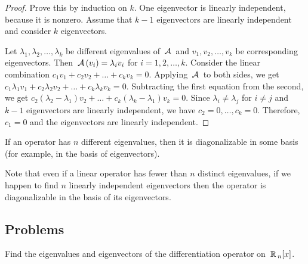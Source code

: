 \begin{proof}
Prove this by induction on $k$. One eigenvector is linearly independent, because it is nonzero. Assume that $k-1$ eigenvectors are linearly independent and consider $k$ eigenvectors.

Let $\lambda_1, \lambda_2, \ldots, \lambda_k$ be different eigenvalues of $\,\mathcal{A}\,$ and $v_1, v_2, \ldots, v_k$ be corresponding eigenvectors. Then $\,\mathcal{A}\,(v_i) = \lambda_i v_i$ for $i = 1, 2, \ldots, k$. Consider the linear combination $c_1 v_1 + c_2 v_2 + \ldots + c_k v_k = 0$. Applying $\,\mathcal{A}\,$ to both sides, we get $c_1 \lambda_1 v_1 + c_2 \lambda_2 v_2 + \ldots + c_k \lambda_k v_k = 0$. Subtracting the first equation from the second, we get $c_2 (\lambda_2 - \lambda_1) v_2 + \ldots + c_k (\lambda_k - \lambda_1) v_k = 0$. Since $\lambda_i \neq \lambda_j$ for $i \neq j$ and $k-1$ eigenvectors are linearly independent, we have $c_2 = 0, \ldots, c_k = 0$. Therefore, $c_1 = 0$ and the eigenvectors are linearly independent.
\end{proof}

\begin{corollary}
If an operator has $n$ different eigenvalues, then it is diagonalizable in some basis (for example, in the basis of eigenvectors).
\end{corollary}

Note that even if a linear operator has fewer than $n$ distinct eigenvalues, if we happen to find $n$ linearly independent eigenvectors then the operator is diagonalizable in the basis of its eigenvectors.

\subsection{Problems}

\begin{problem}
Find the eigenvalues and eigenvectors of the differentiation operator on $\,\mathbb{R}\,_n[x]$.
\end{problem}

